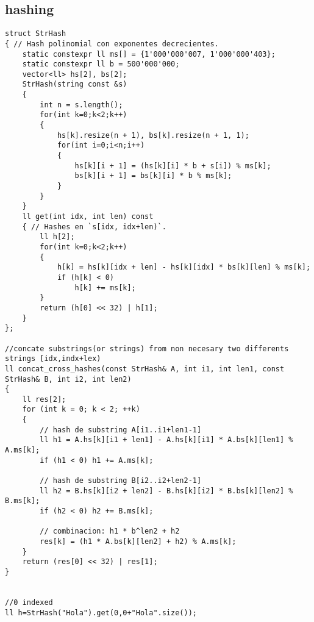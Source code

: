 \subsection*{hashing}
\begin{lstlisting}
struct StrHash
{ // Hash polinomial con exponentes decrecientes.
    static constexpr ll ms[] = {1'000'000'007, 1'000'000'403};
    static constexpr ll b = 500'000'000;
    vector<ll> hs[2], bs[2];
    StrHash(string const &s)
    {
        int n = s.length();
        for(int k=0;k<2;k++)
        {
            hs[k].resize(n + 1), bs[k].resize(n + 1, 1);
            for(int i=0;i<n;i++)
            {
                hs[k][i + 1] = (hs[k][i] * b + s[i]) % ms[k];
                bs[k][i + 1] = bs[k][i] * b % ms[k];
            }
        }
    }
    ll get(int idx, int len) const
    { // Hashes en `s[idx, idx+len)`.
        ll h[2];
        for(int k=0;k<2;k++)
        {
            h[k] = hs[k][idx + len] - hs[k][idx] * bs[k][len] % ms[k];
            if (h[k] < 0)
                h[k] += ms[k];
        }
        return (h[0] << 32) | h[1];
    }
};

//concate substrings(or strings) from non necesary two differents strings [idx,indx+lex)
ll concat_cross_hashes(const StrHash& A, int i1, int len1, const StrHash& B, int i2, int len2)
{
    ll res[2];
    for (int k = 0; k < 2; ++k)
    {
        // hash de substring A[i1..i1+len1-1]
        ll h1 = A.hs[k][i1 + len1] - A.hs[k][i1] * A.bs[k][len1] % A.ms[k];
        if (h1 < 0) h1 += A.ms[k];

        // hash de substring B[i2..i2+len2-1]
        ll h2 = B.hs[k][i2 + len2] - B.hs[k][i2] * B.bs[k][len2] % B.ms[k];
        if (h2 < 0) h2 += B.ms[k];

        // combinacion: h1 * b^len2 + h2
        res[k] = (h1 * A.bs[k][len2] + h2) % A.ms[k];
    }
    return (res[0] << 32) | res[1];
}


//0 indexed
ll h=StrHash("Hola").get(0,0+"Hola".size());
\end{lstlisting}

